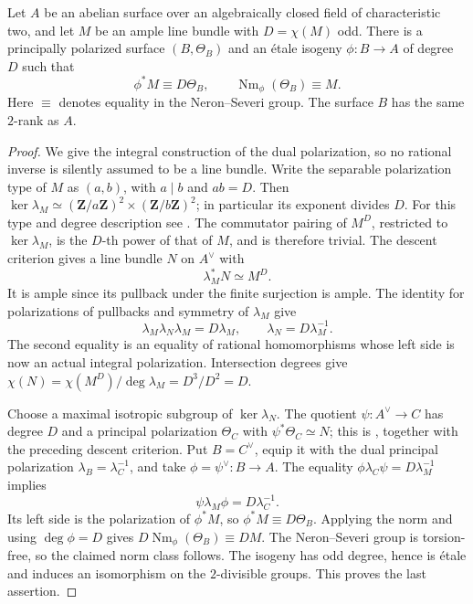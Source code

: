 \begin{lemma}
\label{lem:DE-A3-principal-norm-source}
Let $A$ be an abelian surface over an algebraically closed field of
characteristic two, and let $M$ be an ample line bundle with
$D=\chi(M)$ odd.  There is a principally polarized surface
$(B,\Theta_B)$ and an \'etale isogeny $\phi:B\to A$ of degree $D$
such that
\[
                  \phi^*M\equiv D\Theta_B,
                  \qquad \operatorname{Nm}_\phi(\Theta_B)\equiv M.
\]
Here $\equiv$ denotes equality in the Neron--Severi group.
The surface $B$ has the same $2$-rank as $A$.
\end{lemma}
\begin{proof}
We give the integral construction of the dual polarization, so no
rational inverse is silently assumed to be a line bundle.
Write the separable polarization type of $M$ as $(a,b)$, with
$a\mid b$ and $ab=D$.  Then
$\ker\lambda_M\simeq(\mathbf Z/a\mathbf Z)^2\times
(\mathbf Z/b\mathbf Z)^2$; in particular its exponent divides $D$.
For this type and degree description see
\cite[Section~2, p.~345]{Debarre1994Degrees}.
The commutator pairing of $M^D$, restricted to $\ker\lambda_M$,
is the $D$-th power of that of $M$, and is therefore trivial.
The descent criterion
\cite[Corollary~8.11 and proof, p.~117]
{EdixhovenVanDerGeerMoonenAV} gives a line bundle $N$ on $A^\vee$
with
\[
                         \lambda_M^*N\simeq M^D.
\]
It is ample since its pullback under the finite surjection is ample.
The identity for polarizations of pullbacks and symmetry of
$\lambda_M$ give
\[
             \lambda_M\lambda_N\lambda_M=D\lambda_M,
             \qquad \lambda_N=D\lambda_M^{-1}.
\]
The second equality is an equality of rational homomorphisms whose
left side is now an actual integral polarization.  Intersection
degrees give
$\chi(N)=\chi(M^D)/\deg\lambda_M=D^3/D^2=D$.

Choose a maximal isotropic subgroup of $\ker\lambda_N$.
The quotient $\psi:A^\vee\to C$ has degree $D$ and a principal
polarization $\Theta_C$ with $\psi^*\Theta_C\simeq N$;
this is \cite[Proposition~8.19 and proof, p.~119]
{EdixhovenVanDerGeerMoonenAV}, together with the preceding descent
criterion.  Put $B=C^\vee$, equip it with the dual principal
polarization $\lambda_B=\lambda_C^{-1}$, and take
$\phi=\psi^\vee:B\to A$.
The equality $\phi\lambda_C\psi=D\lambda_M^{-1}$ implies
\[
                 \psi\lambda_M\phi=D\lambda_C^{-1}.
\]
Its left side is the polarization of $\phi^*M$, so
$\phi^*M\equiv D\Theta_B$.
Applying the norm and using $\deg\phi=D$ gives
$D\operatorname{Nm}_\phi(\Theta_B)\equiv DM$.
The Neron--Severi group is torsion-free, so the claimed norm class
follows.  The isogeny has odd degree, hence is \'etale and induces an
isomorphism on the $2$-divisible groups.  This proves the last assertion.
\end{proof}

